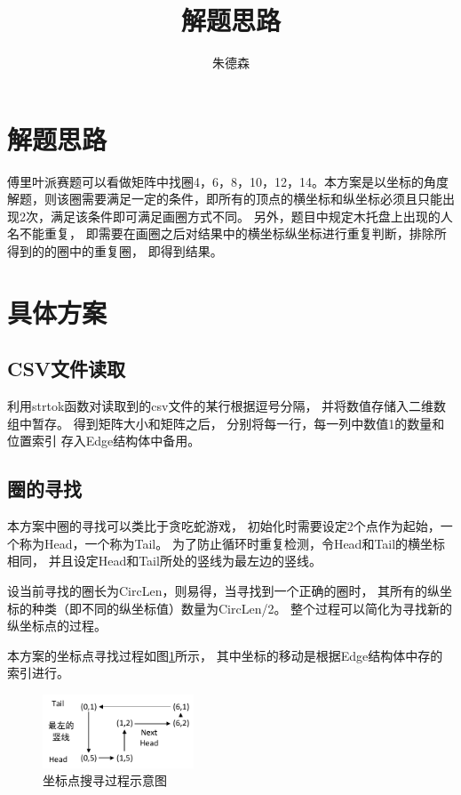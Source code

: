 \documentclass[UTF8]{article}   %
\author{朱德森}
\title{解题思路}
\begin{document}
\songti
\linespread{1.3}
\maketitle
\newpage

\section{解题思路}
傅里叶派赛题可以看做矩阵中找圈4，6，8，10，12，14。本方案是以坐标的角度解题，则该圈需要满足一定的条件，即所有的顶点的横坐标和纵坐标必须且只能出现2次，满足该条件即可满足画圈方式不同。
另外，题目中规定木托盘上出现的人名不能重复，
即需要在画圈之后对结果中的横坐标纵坐标进行重复判断，排除所得到的的圈中的重复圈，
即得到结果。

\section{具体方案}
\subsection{CSV文件读取}
利用strtok函数对读取到的csv文件的某行根据逗号分隔，
并将数值存储入二维数组中暂存。
得到矩阵大小和矩阵之后，
分别将每一行，每一列中数值1的数量和位置索引
存入Edge结构体中备用。

\subsection{圈的寻找}
本方案中圈的寻找可以类比于贪吃蛇游戏，
初始化时需要设定2个点作为起始，一个称为Head，一个称为Tail。
为了防止循环时重复检测，令Head和Tail的横坐标相同，
并且设定Head和Tail所处的竖线为最左边的竖线。

设当前寻找的圈长为CircLen，则易得，当寻找到一个正确的圈时，
其所有的纵坐标的种类（即不同的纵坐标值）数量为CircLen/2。
整个过程可以简化为寻找新的纵坐标点的过程。

本方案的坐标点寻找过程如图{\ref{HeadMove}}所示，
其中坐标的移动是根据Edge结构体中存的索引进行。
\begin{figure}[H]
  \centering
  \includegraphics[width=0.4\textwidth]{./pic/HeadMove}
  \caption{坐标点搜寻过程示意图}
  \label{HeadMove}
\end{figure}
\end{document}
